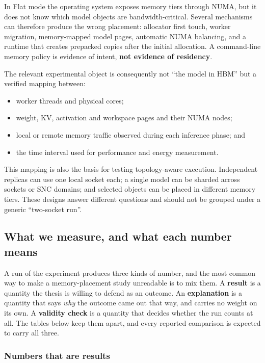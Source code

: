 In Flat mode the operating system exposes memory tiers through NUMA,
but it does not know which model objects are bandwidth-critical.
Several mechanisms can therefore produce the wrong placement:
allocator first touch, worker migration, memory-mapped model pages,
automatic NUMA balancing, and a runtime that creates prepacked copies
after the initial allocation.  A command-line memory policy is evidence
of intent, \textbf{not evidence of residency}.

The relevant experimental object is consequently not ``the model in
HBM'' but a verified mapping between:

\begin{itemize}
  \item worker threads and physical cores;
  \item weight, KV, activation and workspace pages and their NUMA nodes;
  \item local or remote memory traffic observed during each inference
        phase; and
  \item the time interval used for performance and energy measurement.
\end{itemize}

This mapping is also the basis for testing topology-aware execution.
Independent replicas can use one local socket each; a single model can
be sharded across sockets or SNC domains; and selected objects can be
placed in different memory tiers.  These designs answer different
questions and should not be grouped under a generic ``two-socket run''.

\subsection{What we measure, and what each number means}
\label{sec:metrics}

A run of the experiment produces three kinds of number, and the most
common way to make a memory-placement study unreadable is to mix them.
A \textbf{result} is a quantity the thesis is willing to defend as an
outcome.  An \textbf{explanation} is a quantity that says \emph{why}
the outcome came out that way, and carries no weight on its own.  A
\textbf{validity check} is a quantity that decides whether the run
counts at all.  The tables below keep them apart, and every reported
comparison is expected to carry all three.

\subsubsection{Numbers that are results}

